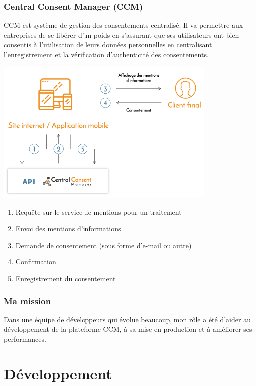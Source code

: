 \documentclass[12pt, a4paper]{report}
\newcommand\tab[1][1cm]{\hspace*{#1}}
\begin{document}
        \subsection{Central Consent Manager (CCM)}
            \tab{} CCM est système de gestion des consentements centralisé. Il va permettre aux entreprises de se libérer d'un poids en s'assurant que ses utilisateurs ont bien consentis à l'utilisation de leurs données personnelles en centralisant l'enregistrement et la vérification d'authenticité des consentements.
            \begin{center}
                \includegraphics[width=0.8\textwidth]{ccm.png}
            \end{center}
            \begin{enumerate}
                \item Requête sur le service de mentions pour un traitement
                \item Envoi des mentions d'informations
                \item Demande de consentement (sous forme d'e-mail ou autre)
                \item Confirmation
                \item Enregistrement du consentement
            \end{enumerate}
        \subsection{Ma mission}
            \tab{} Dans une équipe de développeurs qui évolue beaucoup, mon rôle a été d'aider au développement de la plateforme CCM, à sa mise en production et à améliorer ses performances.
\chapter{Développement}
\end{document}
